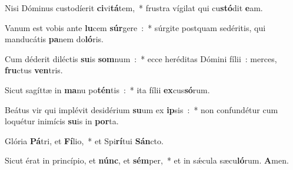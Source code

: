 ﻿\item Nisi Dóminus custodíerit \textbf{ci}\-vi\textbf{tá}\-tem,~* frustra vígilat qui cu\textbf{stó}\-dit \textbf{e}am.
\item Vanum est vobis ante \textbf{lu}\-cem \textbf{súr}\-gere~:~* súrgite postquam sedéritis, qui manducátis \textbf{pa}\-nem do\textbf{ló}ris.
\item Cum déderit diléctis \textbf{su}\-is \textbf{som}\-num~:~* ecce heréditas Dómini fílii~: merces, \textbf{fru}\-ctus \textbf{ven}tris.
\item Sicut sagíttæ in \textbf{ma}\-nu po\textbf{tén}\-tis~:~* ita fílii \textbf{ex}cus\textbf{só}rum.
\item Beátus vir qui implévit desidérium \textbf{su}\-um ex \textbf{ip}\-sis~:~* non confundétur cum loquétur inimícis \textbf{su}\-is in \textbf{por}ta.
\item Glória \textbf{Pá}\-tri, et \textbf{Fí}\-lio,~* et Spi\textbf{rí}\-tui \textbf{Sán}cto.
\item Sicut érat in princípio, et \textbf{núnc}, et \textbf{sém}\-per,~* et in sǽcula sæcu\textbf{ló}\-rum. \textbf{A}men.